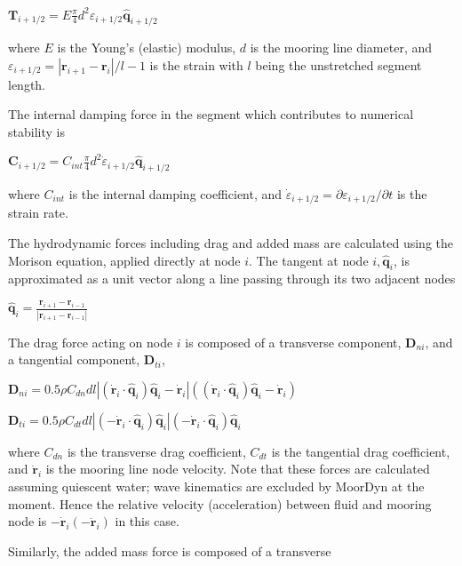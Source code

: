 $\mathbf{T}_{i+1 / 2}=E \frac{\pi}{4} d^{2} \varepsilon_{i+1 / 2} \widehat{\mathbf{q}}_{i+1 / 2}$

where $E$ is the Young's (elastic) modulus, $d$ is the mooring line diameter, and $\varepsilon_{i+1 / 2}=\left|\mathbf{r}_{i+1}-\mathbf{r}_{i}\right| / l-1$ is the strain with $l$ being the unstretched segment length.

The internal damping force in the segment which contributes to numerical stability is

$\mathbf{C}_{i+1 / 2}=C_{i n t} \frac{\pi}{4} d^{2} \dot{\varepsilon}_{i+1 / 2} \widehat{\mathbf{q}}_{i+1 / 2}$

where $C_{i n t}$ is the internal damping coefficient, and $\dot{\varepsilon}_{i+1 / 2}=\partial \varepsilon_{i+1 / 2} / \partial t$ is the strain rate.

The hydrodynamic forces including drag and added mass are calculated using the Morison equation, applied directly at node $i$. The tangent at node $i, \widehat{\mathbf{q}}_{i}$, is approximated as a unit vector along a line passing through its two adjacent nodes

$\widehat{\mathbf{q}}_{i}=\frac{\mathbf{r}_{i+1}-\mathbf{r}_{i-1}}{\left|\mathbf{r}_{i+1}-\mathbf{r}_{i-1}\right|}$

The drag force acting on node $i$ is composed of a transverse component, $\mathbf{D}_{n i}$, and a tangential component, $\mathbf{D}_{t i}$,

$\mathbf{D}_{n i}=0.5 \rho C_{d n} d l\left|\left(\dot{\mathbf{r}}_{i} \cdot \widehat{\mathbf{q}}_{i}\right) \widehat{\mathbf{q}}_{i}-\dot{\mathbf{r}}_{i}\right|\left(\left(\dot{\mathbf{r}}_{i} \cdot \widehat{\mathbf{q}}_{i}\right) \widehat{\mathbf{q}}_{i}-\dot{\mathbf{r}}_{i}\right)$

$\mathbf{D}_{t i}=0.5 \rho C_{d t} d l\left|\left(-\dot{\mathbf{r}}_{i} \cdot \widehat{\mathbf{q}}_{i}\right) \widehat{\mathbf{q}}_{i}\right|\left(-\dot{\mathbf{r}}_{i} \cdot \widehat{\mathbf{q}}_{i}\right) \widehat{\mathbf{q}}_{i}$

where $C_{d n}$ is the transverse drag coefficient, $C_{d t}$ is the tangential drag coefficient, and $\dot{\mathbf{r}}_{i}$ is the mooring line node velocity. Note that these forces are calculated assuming quiescent water; wave kinematics are excluded by MoorDyn at the moment. Hence the relative velocity (acceleration) between fluid and mooring node is $-\dot{\mathbf{r}}_{i}\left(-\ddot{\mathbf{r}}_{i}\right)$ in this case.

Similarly, the added mass force is composed of a transverse

